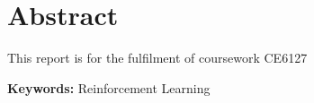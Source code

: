 
\chapter*{Abstract}
This report is for the fulfilment of coursework CE6127
\\
\par
\textbf{Keywords:} Reinforcement Learning

